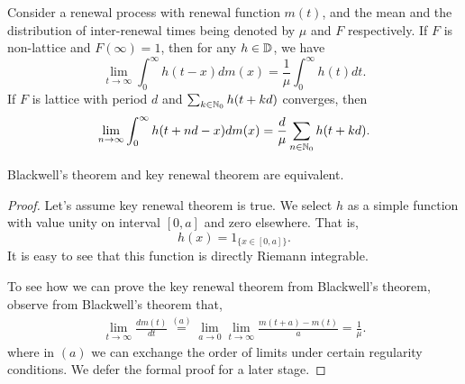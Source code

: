 \documentclass[a4paper,10pt,english]{article}
\begin{document}
\begin{thm} 
Consider a renewal process with renewal function $m(t)$, and the mean and the distribution of inter-renewal times being denoted by $\mu$ and $F$ respectively. 
If $F$ is non-lattice and $F(\infty) = 1$, then for any $h \in \mathbb{D}$, we have 
\begin{equation}
\label{eqn:Key Renewal Theorem}
\lim_{t \rightarrow \infty} \int_{0}^{\infty}h(t-x)dm(x)=\frac{1}{\mu}\int_{0}^{\infty}h(t)dt. 
\end{equation}
If $F$ is lattice with period $d$ and $\sum_{k \in \mathbb{N}_0}h(t+kd)$ converges, then 
\begin{align*}
\lim_{n \rightarrow \infty} \int_{0}^{\infty}h(t+nd-x)dm(x)=\frac{d}{\mu}\sum_{n \in \mathbb{N}_0}h(t+kd). 
\end{align*}
\end{thm}
\begin{prop}[Equivalence] Blackwell's theorem and key renewal theorem are equivalent.
\end{prop}
\begin{proof} Let's assume key renewal theorem is true. We select $h$ as a simple function with value unity on interval $[0, a]$ and zero elsewhere. That is,
\begin{equation*}
h(x) = 1_{\{ x \in [0,a]\}}.
\end{equation*}
It is easy to see that this function is directly Riemann integrable. %

To see how we can prove the key renewal theorem from Blackwell's theorem, observe from Blackwell's theorem that,
\begin{align*}
\lim_{t \to \infty}\frac{dm(t)}{dt} \stackrel{(a)}= \lim_{a \to 0}\lim_{t \to \infty} \frac{m(t
+a)-m(t)}{a}=\frac{1}{\mu}.
\end{align*}     
where in $(a)$ we can exchange the order of limits under certain regularity conditions. 
We defer the formal proof for a later stage.
\end{proof}
\end{document}
